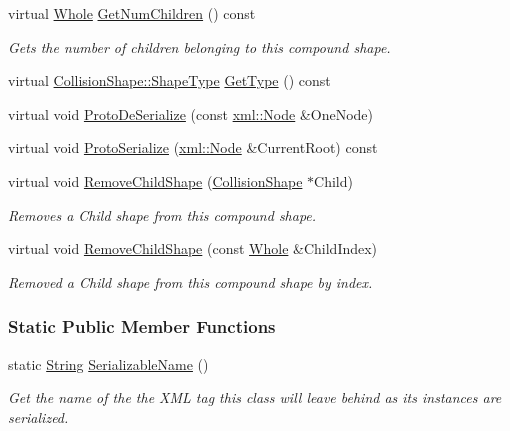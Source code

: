\begin{DoxyCompactItemize}
virtual \hyperlink{namespaceMezzanine_adcbb6ce6d1eb4379d109e51171e2e493}{Whole} \hyperlink{classMezzanine_1_1CompoundCollisionShape_ae21437b0ba98b553a1f651e7eb9f6542}{GetNumChildren} () const 
\begin{DoxyCompactList}\small\item\em Gets the number of children belonging to this compound shape. \item\end{DoxyCompactList}\item 
virtual \hyperlink{classMezzanine_1_1CollisionShape_ad04186055565998879b64176d6dd100d}{CollisionShape::ShapeType} \hyperlink{classMezzanine_1_1CompoundCollisionShape_a8b701bbbc32b007f32884946d285fba1}{GetType} () const 
\item 
virtual void \hyperlink{classMezzanine_1_1CompoundCollisionShape_ac5ab530b16297c765589505b5ad3cd0d}{ProtoDeSerialize} (const \hyperlink{classMezzanine_1_1xml_1_1Node}{xml::Node} \&OneNode)
\item 
virtual void \hyperlink{classMezzanine_1_1CompoundCollisionShape_ad22a3b7f0b69d6cafdd00ccdedce9c56}{ProtoSerialize} (\hyperlink{classMezzanine_1_1xml_1_1Node}{xml::Node} \&CurrentRoot) const 
\item 
virtual void \hyperlink{classMezzanine_1_1CompoundCollisionShape_a4c0e2d16e20b37c4c8fcd96d7229dc1f}{RemoveChildShape} (\hyperlink{classMezzanine_1_1CollisionShape}{CollisionShape} $\ast$Child)
\begin{DoxyCompactList}\small\item\em Removes a Child shape from this compound shape. \item\end{DoxyCompactList}\item 
virtual void \hyperlink{classMezzanine_1_1CompoundCollisionShape_a773f30f7d5046eb3d0ad051332a0b37e}{RemoveChildShape} (const \hyperlink{namespaceMezzanine_adcbb6ce6d1eb4379d109e51171e2e493}{Whole} \&ChildIndex)
\begin{DoxyCompactList}\small\item\em Removed a Child shape from this compound shape by index. \item\end{DoxyCompactList}\end{DoxyCompactItemize}
\subsubsection*{Static Public Member Functions}
\begin{DoxyCompactItemize}
\item 
static \hyperlink{namespaceMezzanine_acf9fcc130e6ebf08e3d8491aebcf1c86}{String} \hyperlink{classMezzanine_1_1CompoundCollisionShape_ab9c063728260ffb425d13703d61df2e9}{SerializableName} ()
\begin{DoxyCompactList}\small\item\em Get the name of the the XML tag this class will leave behind as its instances are serialized. \item\end{DoxyCompactList}\end{DoxyCompactItemize}
